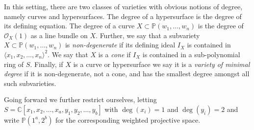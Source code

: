 \documentclass[11pt,reqno]{amsart}
\theoremstyle{remark}
\renewcommand{\O}{\mathcal{O}}
\newcommand{\C}{\mathbb{C}}
\renewcommand{\P}{\mathbb{P}}
\newcommand{\Z}{\mathbb{Z}}
\begin{document}


In this setting, there are two classes of varieties with obvious notions of degree, namely curves and hypersurfaces. The degree of a hypersurface is the degree of its defining equation. The degree of a curve $X \subset \P(w_{1},\ldots,w_{n})$ is the degree of $\O_{X}(1)$ as a line bundle on $X$. Further, we say that a subvariety $X \subset \P(w_{1},\ldots,w_{n})$ is \textit{non-degenerate} if its defining ideal $I_{X}$ is contained in $\langle x_{1},x_{2},\ldots,x_{n}\rangle^{2}$. We say that $X$ is a \textit{cone} if $I_{X}$ is contained in a sub-polynomial ring of $S$. Finally, if $X$ is a curve or hypersurface we say it is a \textit{variety of minimal degree} if it is non-degenerate, not a cone, and has the smallest degree amongst all such subvarieties.

Going forward we further restrict ourselves, letting $S=\C[x_{1},x_{2},\ldots,x_{a},y_{1},y_{2},\ldots,y_{b}]$ with $\deg(x_{i})=1$ and $\deg(y_{i})=2$ and write $\P(1^{a},2^{b})$ for the corresponding weighted projective space. 
%	

\end{document}
